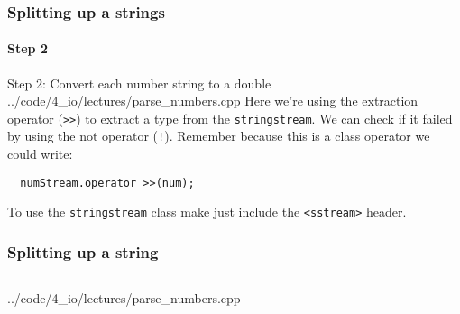 \documentclass{beamer}
\begin{document}
\begin{frame}[fragile]
  \frametitle{Splitting up a strings}
  \framesubtitle{Step 2}
  
  \begin{block}{Step 2: Convert each number string to a double}
  		{../code/4_io/lectures/parse_numbers.cpp}
    Here we're using the extraction operator (\texttt{>>}) to extract a  type from the \texttt{stringstream}.\pause{} \newline
    We can check if it failed by using the not operator (\texttt{!}).  Remember because this is a class operator we could write:
    \begin{lstlisting}
  numStream.operator >>(num);
    \end{lstlisting}
	\end{block}
	To use the \texttt{stringstream} class make just include the \texttt{<sstream>} header.

\end{frame}

\begin{frame}[fragile]
  \frametitle{Splitting up a string}
  \begin{columns}
    \begin{column}[T]{0.75\linewidth}
  			{../code/4_io/lectures/parse_numbers.cpp}
  	\end{column}
  	\begin{column}[T]{0.25\linewidth}
  	\end{column}
  \end{columns}  

\end{frame}
\end{document}
